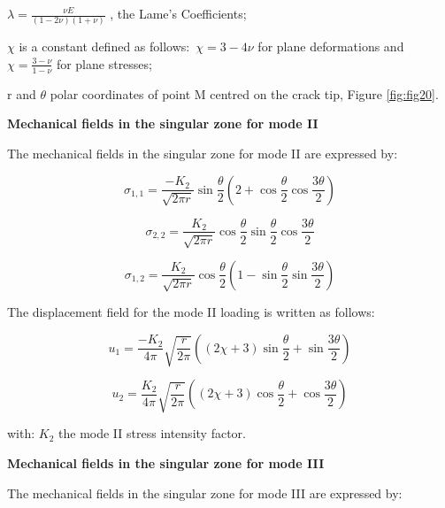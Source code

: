 $\lambda=\displaystyle\frac{\nu E}{(1-2 \nu)(1+\nu)}$ , the Lame’s Coefficients;

$\chi$ is a constant defined as follows:\ $\chi=3-4\nu$ for plane deformations and \ $\chi=\frac{3-\nu}{1-\nu}$  for plane stresses;

r and $\theta$ polar coordinates of point M centred on the crack tip, Figure \ref{fig:fig20}.

\smallskip

\textbf{Mechanical fields in the singular zone for mode II}

The mechanical fields in the singular zone for mode II are expressed by:

\begin{equation}
	\sigma_{1,1} = \frac{-K_{2}}{\sqrt{2 \pi r}} \sin{\frac{\theta}{2}}  \left( 2+\cos{\frac{\theta}{2}} \cos{\frac{3 \theta}{2}} \right)
	\label{eq:eq112}
\end{equation}

\begin{equation}
	\sigma_{2,2} = \frac{K_{2}}{\sqrt{2 \pi r}} \cos{\frac{\theta}{2}}  \sin{\frac{\theta}{2}} \cos{\frac{3 \theta}{2}}
	\label{eq:eq113}
\end{equation}

\begin{equation}
	\sigma_{1,2} = \frac{K_{2}}{\sqrt{2 \pi r}} \cos{\frac{\theta}{2}}  \left( 1-\sin{\frac{\theta}{2}} \sin{\frac{3 \theta}{2}} \right)
	\label{eq:eq114}
\end{equation}

The displacement field for the mode II loading is written as follows:

\begin{equation}
	u_{1} = \frac{-K_{2}}{4 \pi} \sqrt{\frac{r}{2 \pi}} \left((2 \chi+3) \sin{\frac{\theta}{2}}+\sin{\frac{3 \theta}{2}}\right)
	\label{eq:eq115}
\end{equation}

\begin{equation}
	u_{2} = \frac{K_{2}}{4 \pi} \sqrt{\frac{r}{2 \pi}} \left((2 \chi+3) \cos{\frac{\theta}{2}}+\cos{\frac{3 \theta}{2}}\right)
	\label{eq:eq117}
\end{equation}

\noindent with: $K_2$  the mode II stress intensity factor.

\smallskip

\textbf{Mechanical fields in the singular zone for mode III}

The mechanical fields in the singular zone for mode III are expressed by:

